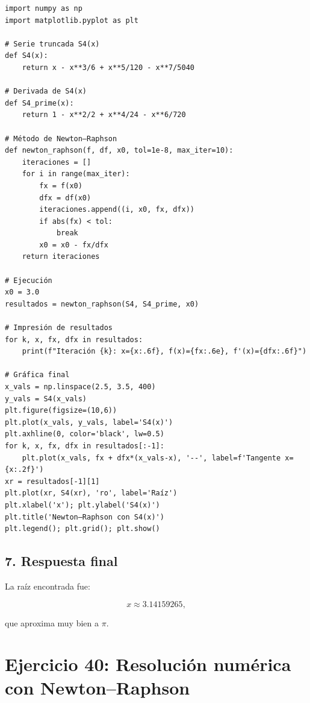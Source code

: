 \documentclass[12pt]{article}
\begin{document}
\begin{tcolorbox}[title=Código Python para el método de Newton–Raphson,
                  colback=white,
                  colframe=black,
                  breakable, enhanced]
\begin{lstlisting}[style=mypython]
import numpy as np
import matplotlib.pyplot as plt

# Serie truncada S4(x)
def S4(x):
    return x - x**3/6 + x**5/120 - x**7/5040

# Derivada de S4(x)
def S4_prime(x):
    return 1 - x**2/2 + x**4/24 - x**6/720

# Método de Newton–Raphson
def newton_raphson(f, df, x0, tol=1e-8, max_iter=10):
    iteraciones = []
    for i in range(max_iter):
        fx = f(x0)
        dfx = df(x0)
        iteraciones.append((i, x0, fx, dfx))
        if abs(fx) < tol:
            break
        x0 = x0 - fx/dfx
    return iteraciones

# Ejecución
x0 = 3.0
resultados = newton_raphson(S4, S4_prime, x0)

# Impresión de resultados
for k, x, fx, dfx in resultados:
    print(f"Iteración {k}: x={x:.6f}, f(x)={fx:.6e}, f'(x)={dfx:.6f}")

# Gráfica final
x_vals = np.linspace(2.5, 3.5, 400)
y_vals = S4(x_vals)
plt.figure(figsize=(10,6))
plt.plot(x_vals, y_vals, label='S4(x)')
plt.axhline(0, color='black', lw=0.5)
for k, x, fx, dfx in resultados[:-1]:
    plt.plot(x_vals, fx + dfx*(x_vals-x), '--', label=f'Tangente x={x:.2f}')
xr = resultados[-1][1]
plt.plot(xr, S4(xr), 'ro', label='Raíz')
plt.xlabel('x'); plt.ylabel('S4(x)')
plt.title('Newton–Raphson con S4(x)')
plt.legend(); plt.grid(); plt.show()
\end{lstlisting}
\end{tcolorbox}

\subsection*{7. Respuesta final}

La raíz encontrada fue:

\[
\boxed{x \approx 3.14159265},
\]

que aproxima muy bien a \(\pi\).











\section*{Ejercicio 40: Resolución numérica con Newton–Raphson}
\end{document}
